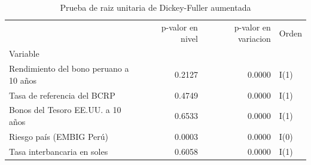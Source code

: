 \begin{table}
\caption{Prueba de raiz unitaria de Dickey-Fuller aumentada}
\label{tab:tabla2_adf}
\begin{tabular}{lrrl}
\toprule
 & p-valor en nivel & p-valor en variacion & Orden \\
Variable &  &  &  \\
\midrule
Rendimiento del bono peruano a 10 años & 0.2127 & 0.0000 & I(1) \\
Tasa de referencia del BCRP & 0.4749 & 0.0000 & I(1) \\
Bonos del Tesoro EE.UU. a 10 años & 0.6533 & 0.0000 & I(1) \\
Riesgo país (EMBIG Perú) & 0.0003 & 0.0000 & I(0) \\
Tasa interbancaria en soles & 0.6058 & 0.0000 & I(1) \\
\bottomrule
\end{tabular}
\end{table}
